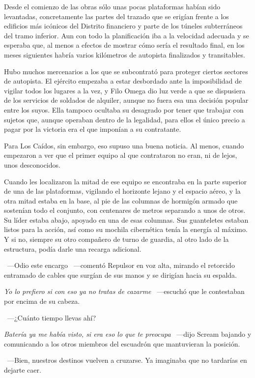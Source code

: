 Desde el comienzo de las obras sólo unas pocas plataformas habían sido levantadas, concretamente las partes del trazado que se erigían frente a los edificios más icónicos del Distrito financiero y parte de los túneles subterráneos del tramo inferior. Aun con todo la planificación iba a la velocidad adecuada y se esperaba que, al menos a efectos de mostrar cómo sería el resultado final, en los meses siguientes habría varios kilómetros de autopista finalizados y transitables.

Hubo muchos mercenarios a los que se subcontrató para proteger ciertos sectores de autopista. El ejército empezaba a estar desbordado ante la imposibilidad de vigilar todos los lugares a la vez, y Filo Omega dio luz verde a que se dispusiera de los servicios de soldados de alquiler, aunque no fuera esa una decisión popular entre los suyos. Ella tampoco ocultaba su desagrado por tener que trabajar con sujetos que, aunque operaban dentro de la legalidad, para ellos el único precio a pagar por la victoria era el que imponían a su contratante.

Para Los Caídos, sin embargo, eso supuso una buena noticia. Al menos, cuando empezaron a ver que el primer equipo al que contrataron no eran, ni de lejos, unos desconocidos.

Cuando les localizaron la mitad de ese equipo se encontraba en la parte superior de una de las plataformas, vigilando el horizonte lejano y el espacio aéreo, y la otra mitad estaba en la base, al pie de las columnas de hormigón armado que sostenían todo el conjunto, con centenares de metros separando a unos de otros. Su líder estaba abajo, apoyado en una de esas columnas. Sus guanteletes estaban listos para la acción, así como su mochila cibernética tenía la energía al máximo. Y si no, siempre su otro compañero de turno de guardia, al otro lado de la estructura, podía darle una recarga adicional.

~---Odio este encargo ~---comentó Repulsor en voz alta, mirando el retorcido entramado de cables que surgían de sus manos y se dirigían hacia su espalda.

\emph{Yo lo prefiero si con eso ya no tratas de cazarme} ~---escuchó que le contestaban por encima de su cabeza.

~---¿Cuánto tiempo llevas ahí?

\emph{Batería ya me había visto, si era eso lo que te preocupa} ~---dijo Scream bajando y comunicando a los otros miembros del escuadrón que mantuvieran la posición.

~---Bien, nuestros destinos vuelven a cruzarse. Ya imaginaba que no tardarías en dejarte caer.

